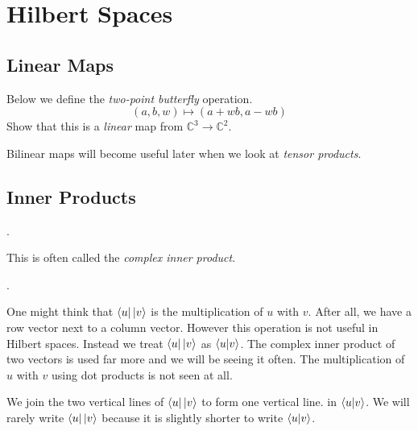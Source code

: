 
\chapter{Hilbert Spaces}


\section{Linear Maps}

\begin{example}
Below we define the \textit{two-point butterﬂy} operation.
$$(a,b,w) \mapsto (a + wb, a-wb)$$
Show that this is a \textit{linear} map from $\mathbb{C}^3 \rightarrow \mathbb{C}^2$. 
\end{example}




Bilinear maps will become useful later when we look at \textit{tensor products}.

\section{Inner Products}


.

This is often called the \textit{complex inner product}. 




.

One might think that $\left\langle u\right|\left|v\right\rangle$ is the multiplication of $u$ with $v$.
After all, we have a row vector next to a column vector. 
However this operation is not useful in Hilbert spaces.  
Instead we treat $\left\langle u\right|\left|v\right\rangle$ as $\left\langle u | v\right\rangle$. The complex 
inner product of two vectors is used far more and we will be seeing it often. 
The multiplication of $u$ with $v$ using dot products is not seen at all. 

We join the two vertical lines of $\left\langle u\right|\left|v\right\rangle$ to form one vertical line. 
in $\left\langle u | v\right\rangle$. We will rarely write $\left\langle u\right|\left|v\right\rangle$ because it is 
slightly shorter to write $\left\langle u | v\right\rangle$. 